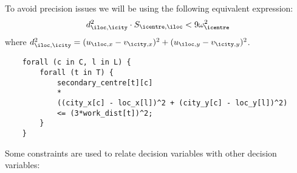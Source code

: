 \begin{enumerate}
    To avoid precision issues we will be using the following equivalent expression:
    \[
    d_{\iloc, \icity}^2 \cdot S_{\icentre, \iloc} < 9\omega_{\icentre}^2
    \]
    where
    $d_{\iloc, \icity}^2 = (u_{\iloc, x} - v_{\icity, x})^2 + (u_{\iloc, y} - v_{\icity, y})^2$.
    
    \begin{lstlisting}
    forall (c in C, l in L) {
    	forall (t in T) {
    	    secondary_centre[t][c]
    	    *
    		((city_x[c] - loc_x[l])^2 + (city_y[c] - loc_y[l])^2)
    		<= (3*work_dist[t])^2;
    	}
    }
    \end{lstlisting}

\end{enumerate}

Some constraints are used to relate decision variables with other decision variables:


